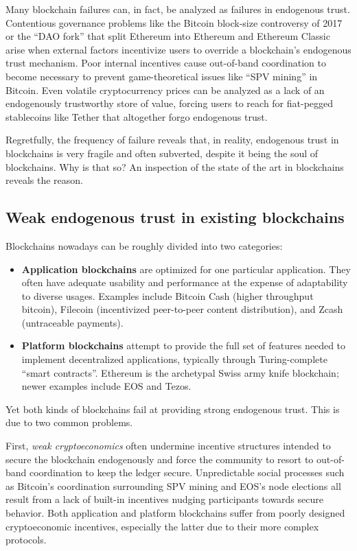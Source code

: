 \documentclass[headinclude,12pt]{scrbook}
\begin{document}
Many blockchain failures can, in fact, be analyzed as failures in endogenous trust. Contentious governance problems like the Bitcoin block-size controversy of 2017 or the ``DAO fork'' that split Ethereum into Ethereum and Ethereum Classic arise when external factors incentivize users to override a blockchain's endogenous trust mechanism. Poor internal incentives cause out-of-band coordination to become necessary to prevent game-theoretical issues like ``SPV mining'' in Bitcoin. Even volatile cryptocurrency prices can be analyzed as a lack of an endogenously trustworthy store of value, forcing users to reach for fiat-pegged stablecoins like Tether that altogether forgo endogenous trust.

Regretfully, the frequency of failure reveals that, in reality, endogenous trust in blockchains is very fragile and often subverted, despite it being the soul of blockchains. Why is that so? An inspection of the state of the art in blockchains reveals the reason.

\subsection{Weak endogenous trust in existing blockchains}

Blockchains nowadays can be roughly divided into two categories:

\begin{itemize}
    \item \textbf{Application blockchains} are optimized for one particular application. They often have adequate usability and performance at the expense of adaptability to diverse usages. Examples include Bitcoin Cash (higher throughput bitcoin), Filecoin (incentivized peer-to-peer content distribution), and Zcash (untraceable payments).
    \item \textbf{Platform blockchains} attempt to provide the full set of features needed to implement decentralized applications, typically through Turing-complete ``smart contracts''. Ethereum is the archetypal Swiss army knife blockchain; newer examples include EOS and Tezos.
\end{itemize}

Yet both kinds of blockchains fail at providing strong endogenous trust. This is due to two common problems.

First, \emph{weak cryptoeconomics} often undermine incentive structures intended to secure the blockchain endogenously and force the community to resort to out-of-band coordination to keep the ledger secure. Unpredictable social processes such as Bitcoin's coordination surrounding SPV mining and EOS's node elections all result from a lack of built-in incentives nudging participants towards secure behavior. Both application and platform blockchains suffer from poorly designed cryptoeconomic incentives, especially the latter due to their more complex protocols.
\end{document}
